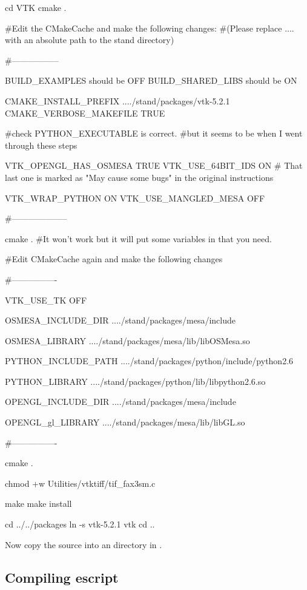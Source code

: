 \begin{shellCode}
cd VTK
cmake .

#Edit the CMakeCache and make the following changes: 
#(Please replace .... with an absolute path to the stand directory)

#-----------------

BUILD_EXAMPLES should be OFF
BUILD_SHARED_LIBS should be ON

CMAKE_INSTALL_PREFIX	..../stand/packages/vtk-5.2.1
CMAKE_VERBOSE_MAKEFILE	TRUE

#check PYTHON_EXECUTABLE is correct.
#but it seems to be when I went through these steps

VTK_OPENGL_HAS_OSMESA	TRUE
VTK_USE_64BIT_IDS	ON
# That last one is marked as "May cause some bugs" in the original instructions

VTK_WRAP_PYTHON	ON
VTK_USE_MANGLED_MESA	OFF

#--------------------

cmake .
#It won't work but it will put some variables in that you need.

#Edit CMakeCache again and make the following changes

#----------------

VTK_USE_TK	OFF

OSMESA_INCLUDE_DIR	..../stand/packages/mesa/include

OSMESA_LIBRARY	..../stand/packages/mesa/lib/libOSMesa.so

PYTHON_INCLUDE_PATH	..../stand/packages/python/include/python2.6

PYTHON_LIBRARY	..../stand/packages/python/lib/libpython2.6.so

OPENGL_INCLUDE_DIR	..../stand/packages/mesa/include

OPENGL_gl_LIBRARY	..../stand/packages/mesa/lib/libGL.so

#----------------

cmake .

chmod +w Utilities/vtktiff/tif_fax3sm.c

make
make install


cd ../../packages
ln -s vtk-5.2.1 vtk
cd ..
\end{shellCode}

Now copy the \esfinley source into an  directory in .

\subsection{Compiling escript}\label{sec:compileescriptlinux}


